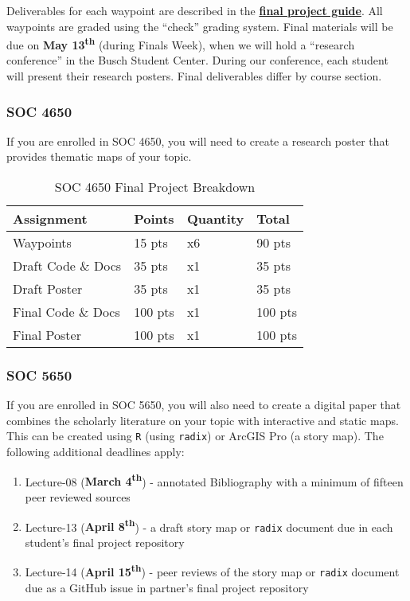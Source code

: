 \documentclass[
]{book}
\providecommand{\tightlist}{%
  \setlength{\itemsep}{0pt}\setlength{\parskip}{0pt}}
\begin{document}
Deliverables for each waypoint are described in the \href{https://slu-soc5650.github.io/finalGuide}{\textbf{final project guide}}. All waypoints are graded using the ``check'' grading system. Final materials will be due on \textbf{May 13\textsuperscript{th}} (during Finals Week), when we will hold a ``research conference'' in the Busch Student Center. During our conference, each student will present their research posters. Final deliverables differ by course section.

\hypertarget{soc-4650}{%
\subsubsection{SOC 4650}\label{soc-4650}}

If you are enrolled in SOC 4650, you will need to create a research poster that provides thematic maps of your topic.

\begin{table}

\caption{\label{tab:unnamed-chunk-5}SOC 4650 Final Project Breakdown}
\centering
\begin{tabular}[t]{llll}
\toprule
Assignment & Points & Quantity & Total\\
\midrule
Waypoints & 15 pts & x6 & 90 pts\\
Draft Code \& Docs & 35 pts & x1 & 35 pts\\
Draft Poster & 35 pts & x1 & 35 pts\\
Final Code \& Docs & 100 pts & x1 & 100 pts\\
Final Poster & 100 pts & x1 & 100 pts\\
\bottomrule
\end{tabular}
\end{table}

\hypertarget{soc-5650}{%
\subsubsection{SOC 5650}\label{soc-5650}}

If you are enrolled in SOC 5650, you will also need to create a digital paper that combines the scholarly literature on your topic with interactive and static maps. This can be created using \texttt{R} (using \texttt{radix}) or ArcGIS Pro (a story map). The following additional deadlines apply:

\begin{enumerate}
\def\labelenumi{\arabic{enumi}.}
\tightlist
\item
  Lecture-08 (\textbf{March 4\textsuperscript{th}}) - annotated Bibliography with a minimum of fifteen peer reviewed sources
\item
  Lecture-13 (\textbf{April 8\textsuperscript{th}}) - a draft story map or \texttt{radix} document due in each student's final project repository
\item
  Lecture-14 (\textbf{April 15\textsuperscript{th}}) - peer reviews of the story map or \texttt{radix} document due as a GitHub issue in partner's final project repository
\end{enumerate}
\end{document}
